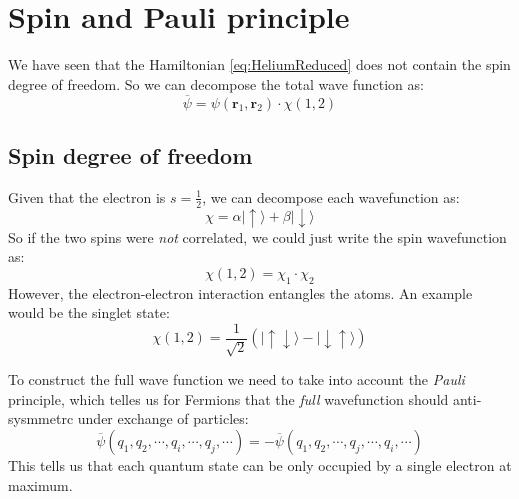 \documentclass[10pt]{article}
\begin{document}
\section{Spin and Pauli principle}

We have seen that the Hamiltonian \eqref{eq:HeliumReduced} does not contain the spin degree of freedom. So we can decompose the total wave function as:
\begin{equation}
\overline{\psi} = \psi(\mathbf{r}_1, \mathbf{r}_2) \cdot \chi(1,2)
\end{equation}

\subsection{Spin degree of freedom}

Given that the electron is $s=\frac{1}{2}$, we can decompose each wavefunction as:
\begin{equation}
\chi = \alpha |\uparrow\rangle + \beta |\downarrow\rangle
\end{equation}
So if the two spins were \textit{not} correlated, we could just write the spin wavefunction as:
\begin{equation}
\chi(1,2) = \chi_\mathrm{1}\cdot\chi_\mathrm{2}
\end{equation}
However, the electron-electron interaction entangles the atoms. An example would be the singlet state:
\begin{equation}
\chi(1,2) = \frac{1}{\sqrt{2}}\left(|\uparrow \downarrow\rangle - |\downarrow\uparrow \rangle\right)
\end{equation}

To construct the full wave function we need to take into account the \textit{Pauli} principle, which telles us for Fermions that the \textit{full} wavefunction should anti-sysmmetrc under exchange of particles:
\begin{equation}
\overline{\psi}(q_1, q_2, \cdots, q_i,\cdots,  q_j, \cdots) = 
-\overline{\psi}(q_1, q_2, \cdots, q_j,\cdots,  q_i, \cdots)
\end{equation}
This tells us that each quantum state can be only occupied by a single electron at maximum.
\end{document}

